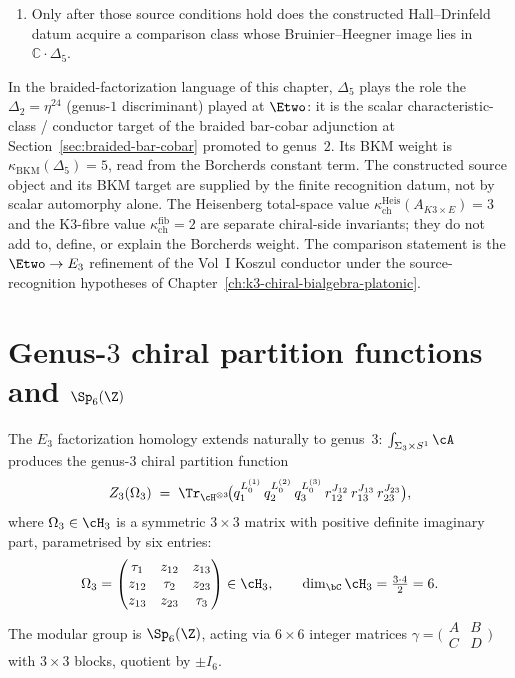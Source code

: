 \begin{remark}
\begin{enumerate}[label=\textup{(\roman*)}]
 PBW comparison, and Mittag--Leffler transition compatibility.
 \item Only after those source conditions hold does the constructed
 Hall--Drinfeld datum acquire a comparison class whose
 Bruinier--Heegner image lies in $\mathbb C\cdot\Delta_5$.
\end{enumerate}
In the braided-factorization language of this chapter, $\Delta_5$
plays the role the $\Delta_2 = \eta^{24}$ (genus-$1$ discriminant)
played at $\Etwo$: it is the scalar characteristic-class / conductor
target of the braided bar-cobar adjunction at
Section~\ref{sec:braided-bar-cobar} promoted to genus~$2$. Its BKM
weight is $\kappa_{\mathrm{BKM}}(\Delta_5)=5$, read from the Borcherds constant
term. The constructed source object and its BKM target are supplied by
the finite recognition datum, not by scalar automorphy alone. The
Heisenberg total-space value
$\kappa_{\mathrm{ch}}^{\mathrm{Heis}}(A_{K3 \times E}) = 3$ and the
K3-fibre value $\kappa_{\mathrm{ch}}^{\mathrm{fib}} = 2$ are separate
chiral-side invariants; they do not add to, define, or explain the
Borcherds weight. The comparison statement is the $\Etwo \to E_3$
refinement of the Vol~I Koszul conductor under the source-recognition
hypotheses of Chapter~\ref{ch:k3-chiral-bialgebra-platonic}.
\end{remark}


\section{Genus-\texorpdfstring{$3$}{3} chiral partition functions and \texorpdfstring{$\Sp_6(\Z)$}{Sp-6(Z)}}
\label{sec:genus-3-partition}

The $E_3$ factorization homology extends naturally to genus~$3$:
$\int_{\Sigma_3 \times S^1} \cA$ produces the genus-$3$ chiral
partition function
\[
 Z_3(\Omega_3)
 \;=\;
 \Tr_{\cH^{\otimes 3}}\!\bigl(q_1^{L_0^{(1)}}\, q_2^{L_0^{(2)}}\,
 q_3^{L_0^{(3)}}\,
 r_{12}^{J_{12}}\, r_{13}^{J_{13}}\, r_{23}^{J_{23}}\bigr),
\]
where $\Omega_3 \in \cH_3$ is a symmetric $3 \times 3$ matrix
with positive definite imaginary part, parametrised by six entries:
\[
 \Omega_3 = \begin{pmatrix} \tau_1 & z_{12} & z_{13} \\
 z_{12} & \tau_2 & z_{23} \\ z_{13} & z_{23} & \tau_3 \end{pmatrix}
 \in \cH_3,
 \qquad
 \dim_\bC \cH_3 = \tfrac{3 \cdot 4}{2} = 6.
\]
The modular group is $\Sp_6(\Z)$, acting via $6 \times 6$
integer matrices $\gamma = \bigl(\begin{smallmatrix} A & B \\ C & D
\end{smallmatrix}\bigr)$ with $3 \times 3$ blocks,
quotient by $\pm I_6$.

